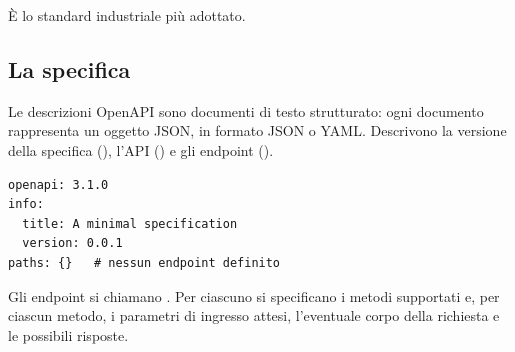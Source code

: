 È lo standard industriale più adottato.


\subsection{La specifica}

Le descrizioni OpenAPI sono documenti di testo strutturato: ogni documento
rappresenta un oggetto JSON, in formato JSON o YAML. Descrivono la versione
della specifica (), l'API () e gli endpoint
().

\begin{lstlisting}[style=plain, name=openapi.yaml]
openapi: 3.1.0
info:
  title: A minimal specification
  version: 0.0.1
paths: {}   # nessun endpoint definito
\end{lstlisting}

Gli endpoint si chiamano . Per ciascuno si specificano i metodi
supportati e, per ciascun metodo, i parametri di ingresso attesi, l'eventuale
corpo della richiesta e le possibili risposte.

